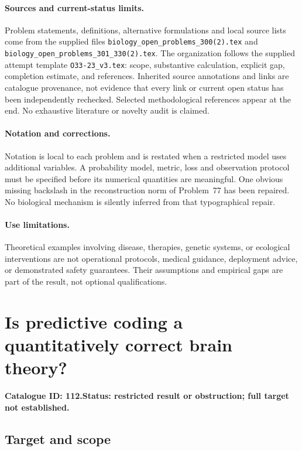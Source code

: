 \documentclass[11pt]{article}
\begin{document}
\paragraph{Sources and current-status limits.}
Problem statements, definitions, alternative formulations and local source lists
come from the supplied files
\texttt{biology\_open\_problems\_300(2).tex} and
\texttt{biology\_open\_problems\_301\_330(2).tex}.
The organization follows the supplied attempt template
\texttt{O33-23\_v3.tex}: scope, substantive calculation, explicit gap,
completion estimate, and references. Inherited source annotations and links are
catalogue provenance, not evidence that every link or current open status has
been independently rechecked. Selected methodological references appear at the
end. No exhaustive literature or novelty audit is claimed.

\paragraph{Notation and corrections.}
Notation is local to each problem and is restated when a restricted model uses
additional variables. A probability model, metric, loss and observation protocol
must be specified before its numerical quantities are meaningful. One obvious
missing backslash in the reconstruction norm of Problem~77 has been repaired.
No biological mechanism is silently inferred from that typographical repair.

\paragraph{Use limitations.}
Theoretical examples involving disease, therapies, genetic systems, or ecological
interventions are not operational protocols, medical guidance, deployment advice,
or demonstrated safety guarantees. Their assumptions and empirical gaps are part
of the result, not optional qualifications.

\setcounter{section}{111}
\section{Is predictive coding a quantitatively correct brain theory?}
\label{prob:112}
\noindent\textbf{Catalogue ID: 112.}\quad \textbf{Status: restricted result or obstruction; full target not established.}
\subsection{Target and scope}
\end{document}
